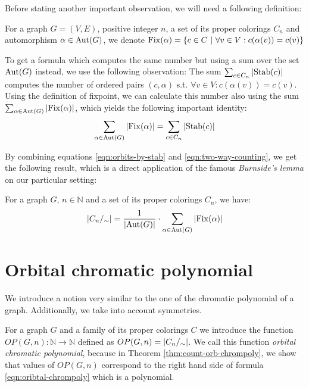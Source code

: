 Before stating another important observation, we will need a following definition:

\begin{defn}[fixpoint]
    For a graph $G = (V,E)$, positive integer $n$, a set of its proper colorings $C_n$ and automorphism $\alpha \in \operatorname{Aut}(G)$, we denote $\operatorname{Fix}(\alpha)= \{ c \in C \ | \ \forall v \in V : c(\alpha(v)) = c(v) \}$
\end{defn}

To get a formula which computes the same number but using a sum over the set $\operatorname{Aut}(G)$ instead, we use the following observation: The sum $\sum_{c \in C_n} \left|{\operatorname{Stab}(c)}\right|$ computes the number of ordered pairs $(c,\alpha)$ s.t. $\forall v \in V : c(\alpha(v)) = c(v)$. Using the definition of fixpoint, we can calculate this number also using the sum $\sum_{\alpha \in \operatorname{Aut}(G)} \left|{\operatorname{Fix}(\alpha)}\right|$, which yields the following important identity:
\begin{equation}\label{eqn:two-way-counting}
    \sum_{\alpha \in \operatorname{Aut}(G)} \left|{\operatorname{Fix}(\alpha)}\right| = \sum_{c \in C_n}\left|{\operatorname{Stab}(c)}\right|    
\end{equation}

By combining equations \ref{eqn:orbits-by-stab} and \ref{eqn:two-way-counting}, we get the following result, which is a direct application of the famous \textit{Burnside's lemma} on our particular setting:

\begin{thm} \label{thm:burnside}
    For a graph $G$, $n \in \mathbb{N}$ and a set of its proper colorings $C_n$, we have:
    $$\left|{C_n/_\sim}\right| = \frac{1}{\left|{\operatorname{Aut}(G)}\right|}\cdot \sum_{\alpha \in \operatorname{Aut}(G)}\left|{\operatorname{Fix}(\alpha)}\right|$$
\end{thm}

\section{Orbital chromatic polynomial}

We introduce a notion very similar to the one of the chromatic polynomial of a graph. Additionally, we take into account symmetries.


\begin{defn}
    For a graph $G$ and a family of its proper colorings $C$ we introduce the function $OP(G,n): \mathbb{N}\to \mathbb{N}$ defined as $
    OP(G,n)=\left|{C_n/_\sim}\right|$. We call this function \emph{orbital chromatic polynomial}, because 
    in Theorem \ref{thm:count-orb-chrompoly}, we show that values of $OP(G,n)$ 
    correspond to the right hand side of formula \ref{eqn:oribtal-chrompoly} which is a polynomial.
\end{defn}

